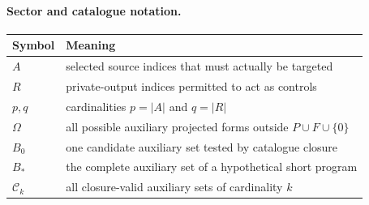\documentclass[11pt]{article}
\begin{document}
\paragraph{Sector and catalogue notation.}
\begin{center}\begin{tabular}{lp{.70\linewidth}}\toprule
Symbol&Meaning\\\midrule
$A$&selected source indices that must actually be targeted\\
$R$&private-output indices permitted to act as controls\\
$p,q$&cardinalities $p=|A|$ and $q=|R|$\\
$\Omega$&all possible auxiliary projected forms outside $P\cup F\cup\{0\}$\\
$B_0$&one candidate auxiliary set tested by catalogue closure\\
$B_*$&the complete auxiliary set of a hypothetical short program\\
$\mathcal C_k$&all closure-valid auxiliary sets of cardinality $k$\\\bottomrule
\end{tabular}\end{center}
\end{document}
